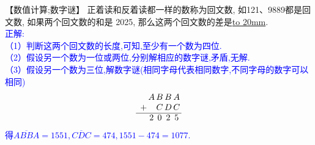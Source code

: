 \item {
    【数值计算;数字谜】
    正着读和反着读都一样的数称为回文数, 如121、9889都是回文数, 如果两个回文数的和是 2025, 那么这两个回文数的差是\underline{\hbox to 20mm{}}.
    \ifshowSolution
        \\\fangsong{}\textcolor{blue}{
            正解: \\
            （1）判断这两个回文数的长度,可知,至少有一个数为四位.\\
            （2）假设另一个数为一位或两位,分别解相应的数字谜,矛盾,无解.\\
            （3）假设另一个数为三位,解数字谜(相同字母代表相同数字,不同字母的数字可以相同)
            \[
            \begin{array}{l@{\,} c@{\,} c@{\,} c@{\,} c@{\,}}
            & A & B & B & A \\
            + && C  & D & C \\
            \cline{1-5}
            & 2 & 0 & 2 & 5 \\
            \end{array}
            \]
            得$\overline{ABBA}=1551, \overline{CDC}=474, 1551-474=1077.$\\
        }
    \else
        \vspace{1cm}
    \fi
}

